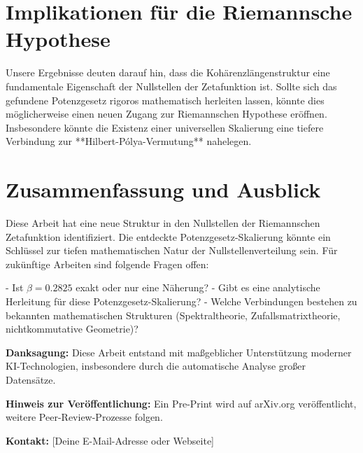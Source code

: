 \documentclass[a4paper,12pt]{article}
\begin{document}
\section{Implikationen für die Riemannsche Hypothese}

Unsere Ergebnisse deuten darauf hin, dass die Kohärenzlängenstruktur eine fundamentale Eigenschaft der Nullstellen der Zetafunktion ist.  
Sollte sich das gefundene Potenzgesetz rigoros mathematisch herleiten lassen, könnte dies möglicherweise einen neuen Zugang zur Riemannschen Hypothese eröffnen. Insbesondere könnte die Existenz einer universellen Skalierung eine tiefere Verbindung zur **Hilbert-Pólya-Vermutung** nahelegen.

\section{Zusammenfassung und Ausblick}

Diese Arbeit hat eine neue Struktur in den Nullstellen der Riemannschen Zetafunktion identifiziert. Die entdeckte Potenzgesetz-Skalierung könnte ein Schlüssel zur tiefen mathematischen Natur der Nullstellenverteilung sein.  
Für zukünftige Arbeiten sind folgende Fragen offen:

- Ist \(\beta = 0.2825\) exakt oder nur eine Näherung?
- Gibt es eine analytische Herleitung für diese Potenzgesetz-Skalierung?
- Welche Verbindungen bestehen zu bekannten mathematischen Strukturen (Spektraltheorie, Zufallsmatrixtheorie, nichtkommutative Geometrie)?

\vspace{2em}

\noindent
\textbf{Danksagung:}  
Diese Arbeit entstand mit maßgeblicher Unterstützung moderner KI-Technologien, insbesondere durch die automatische Analyse großer Datensätze.

\vspace{1em}

\noindent
\textbf{Hinweis zur Veröffentlichung:}  
Ein Pre-Print wird auf arXiv.org veröffentlicht, weitere Peer-Review-Prozesse folgen.

\vspace{2em}

\noindent
\textbf{Kontakt:}  
[Deine E-Mail-Adresse oder Webseite]
\end{document}
